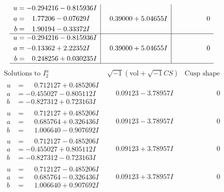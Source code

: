 \documentclass[1p]{elsarticle_modified}
\theoremstyle{definition}
\newcommand{\I}{\sqrt{-1}}
\begin{document}
$$\begin{array}{c|c|c}
\begin{aligned}
u &= -0.294216 - 0.815936 I \\
a &= \phantom{-}1.77206 - 0.07629 I \\
b &= \phantom{-}1.90194 - 0.33372 I\end{aligned}
 & \phantom{-}0.39000 + 5.04655 I & \phantom{-0.000000 } 0 \\ \hline\begin{aligned}
u &= -0.294216 - 0.815936 I \\
a &= -0.13362 + 2.22352 I \\
b &= \phantom{-}0.248256 + 0.030235 I\end{aligned}
 & \phantom{-}0.39000 + 5.04655 I & \phantom{-0.000000 } 0\\
 \hline 
 \end{array}$$\newpage$$\begin{array}{c|c|c}  
\text{Solutions to }I^u_{2}& \I (\text{vol} + \sqrt{-1}CS) & \text{Cusp shape}\\
 \hline 
\begin{aligned}
u &= \phantom{-}0.712127 + 0.485206 I \\
a &= -0.455027 - 0.805112 I \\
b &= -0.827312 + 0.723163 I\end{aligned}
 & \phantom{-}0.09123 - 3.78957 I & \phantom{-0.000000 } 0 \\ \hline\begin{aligned}
u &= \phantom{-}0.712127 + 0.485206 I \\
a &= \phantom{-}0.685764 + 0.326436 I \\
b &= \phantom{-}1.006640 - 0.907692 I\end{aligned}
 & \phantom{-}0.09123 - 3.78957 I & \phantom{-0.000000 } 0 \\ \hline\begin{aligned}
u &= \phantom{-}0.712127 - 0.485206 I \\
a &= -0.455027 + 0.805112 I \\
b &= -0.827312 - 0.723163 I\end{aligned}
 & \phantom{-}0.09123 + 3.78957 I & \phantom{-0.000000 } 0 \\ \hline\begin{aligned}
u &= \phantom{-}0.712127 - 0.485206 I \\
a &= \phantom{-}0.685764 - 0.326436 I \\
b &= \phantom{-}1.006640 + 0.907692 I\end{aligned}
 & \phantom{-}0.09123 + 3.78957 I & \phantom{-0.000000 } 0 \\ \hline\begin{aligned}

\end{aligned}
\end{array}$$
\end{document}
